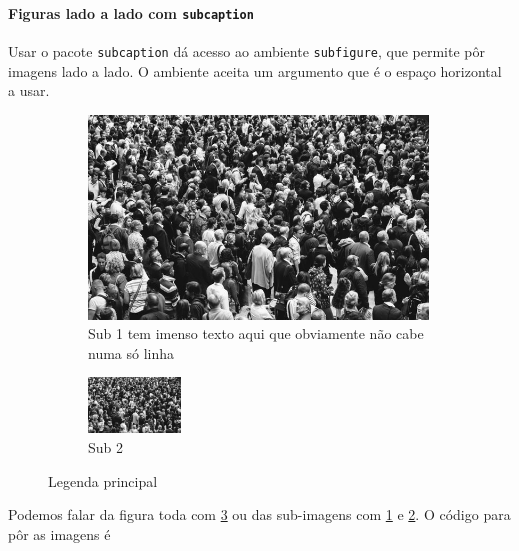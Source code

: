 \documentclass[11pt]{article}
\begin{document}
\paragraph{Figuras lado a lado com \texttt{subcaption}}
Usar o pacote \texttt{subcaption} dá acesso ao ambiente \texttt{subfigure},
que permite pôr imagens lado a lado.
O ambiente aceita um argumento que é o espaço horizontal a usar.
\begin{figure}[H]
    \centering
    \begin{subfigure}{0.49\textwidth}
        \centering
        \includegraphics[width=0.99\textwidth]{graphics/crowd.jpg}
        \caption{
            Sub 1 tem imenso texto aqui
            que obviamente não cabe numa só linha
        }
        \label{fig:sub1}
    \end{subfigure}
    \begin{subfigure}{0.49\textwidth}
        \centering
        \includegraphics[height=4em]{graphics/crowd.jpg}
        \caption{Sub 2}
        \label{fig:sub2}
    \end{subfigure}
    \caption{Legenda principal}
    \label{fig:big-figure}
\end{figure}
Podemos falar da figura toda com \ref{fig:big-figure} ou das sub-imagens com
\ref{fig:sub1} e \ref{fig:sub2}.
O código para pôr as imagens é
\end{document}
